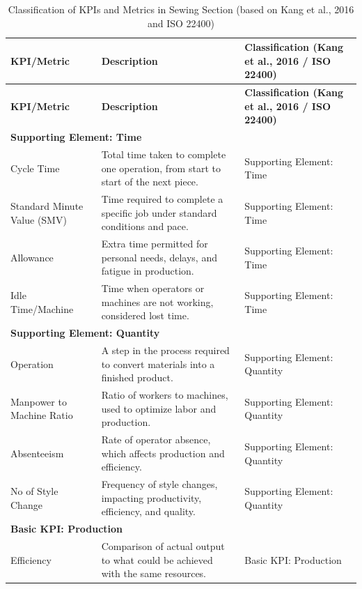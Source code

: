 \begin{longtable}{|p{3cm}|p{7cm}|p{4cm}|}
	\caption{Classification of KPIs and Metrics in Sewing Section (based on Kang et al., 2016 and ISO 22400)} \\
	\hline
	\textbf{KPI/Metric} & \textbf{Description} & \textbf{Classification (Kang et al., 2016 / ISO 22400)} \\
	\hline
	\endfirsthead
	
	\hline
	\textbf{KPI/Metric} & \textbf{Description} & \textbf{Classification (Kang et al., 2016 / ISO 22400)} \\
	\hline
	\endhead
	\multicolumn{3}{|l|}{\textbf{Supporting Element: Time}} \\
	\hline
	Cycle Time & Total time taken to complete one operation, from start to start of the next piece. & Supporting Element: Time \\
	\hline
	Standard Minute Value (SMV) & Time required to complete a specific job under standard conditions and pace. & Supporting Element: Time \\
	\hline
	Allowance & Extra time permitted for personal needs, delays, and fatigue in production. & Supporting Element: Time \\
	\hline
	Idle Time/Machine & Time when operators or machines are not working, considered lost time. & Supporting Element: Time \\
	\hline
	\multicolumn{3}{|l|}{\textbf{Supporting Element: Quantity}} \\
	\hline
	Operation & A step in the process required to convert materials into a finished product. & Supporting Element: Quantity \\
	\hline
	Manpower to Machine Ratio & Ratio of workers to machines, used to optimize labor and production. & Supporting Element: Quantity \\
	\hline
	Absenteeism & Rate of operator absence, which affects production and efficiency. & Supporting Element: Quantity \\
	\hline
	No of Style Change & Frequency of style changes, impacting productivity, efficiency, and quality. & Supporting Element: Quantity \\
	\hline
	\multicolumn{3}{|l|}{\textbf{Basic KPI: Production}} \\
	\hline
	Efficiency & Comparison of actual output to what could be achieved with the same resources. & Basic KPI: Production \\

\end{longtable}
